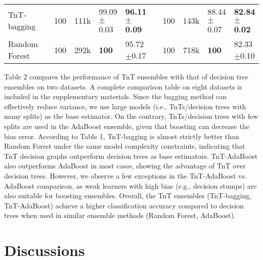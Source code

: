 \documentclass{article}
\begin{document}
\begin{table}[h]
{\begin{tabular}{lllllllllll}
     TnT-bagging & & 100 &  111k  & 99.09$\pm$0.03 & \textbf{96.11$\pm$0.09} &
     & 100 &  143k  & 88.44$\pm$0.07 & \textbf{82.84$\pm$0.02}  \\
     Random Forest & & 100 & 292k & \textbf{100} & 95.72$\pm$0.17 &
     & 100 & 718k & \textbf{100} & 82.33$\pm$0.10\\
    \bottomrule
  \end{tabular}
  }
\end{table}

Table 2 compares the performance of TnT ensembles with that of decision tree ensembles on two datasets. A complete comparison table on eight datasets is included in the supplementary materials. Since the bagging method can effectively reduce variance, we use large models (i.e., TnTs/decision trees with many splits) as the base estimator. On the contrary, TnTs/decision trees with few splits are used in the AdaBoost ensemble, given that boosting can decrease the bias error. According to Table 1, TnT-bagging is almost strictly better than Random Forest under the same model complexity constraints, indicating that TnT decision graphs outperform decision trees as base estimators. TnT-AdaBoost also outperforms AdaBoost in most cases, showing the advantage of TnT over decision trees. However, we observe a few exceptions in the TnT-AdaBoost vs. AdaBoost comparison, as weak learners with high bias (e.g., decision stumps) are also suitable for boosting ensembles. Overall, the TnT ensembles (TnT-bagging, TnT-AdaBoost) achieve a higher classification accuracy compared to decision trees when used in similar ensemble methods (Random Forest, AdaBoost).


\vspace{-0mm}
\section{Discussions}\vspace{-0mm}
\end{document}
